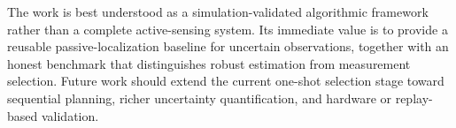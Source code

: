 \documentclass[preprint,12pt]{elsarticle}
\begin{document}
The work is best understood as a simulation-validated algorithmic framework rather than a complete active-sensing system. Its immediate value is to provide a reusable passive-localization baseline for uncertain observations, together with an honest benchmark that distinguishes robust estimation from measurement selection. Future work should extend the current one-shot selection stage toward sequential planning, richer uncertainty quantification, and hardware or replay-based validation.



\end{document}
